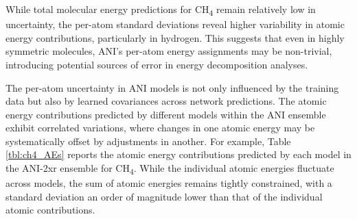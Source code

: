 While total molecular energy predictions for CH\textsubscript{4} remain relatively low in uncertainty, the per-atom standard deviations reveal higher variability in atomic energy contributions, particularly in hydrogen. This suggests that even in highly symmetric molecules, ANI's per-atom energy assignments may be non-trivial, introducing potential sources of error in energy decomposition analyses.

The per-atom uncertainty in ANI models is not only influenced by the training data but also by learned covariances across network predictions. The atomic energy contributions predicted by different models within the ANI ensemble exhibit correlated variations, where changes in one atomic energy may be systematically offset by adjustments in another.
For example, Table \ref{tbl:ch4_AEs} reports the atomic energy contributions predicted by each model in the ANI-2xr ensemble for CH\textsubscript{4}. While the individual atomic energies fluctuate across models, the sum of atomic energies remains tightly constrained, with a standard deviation an order of magnitude lower than that of the individual atomic contributions.

